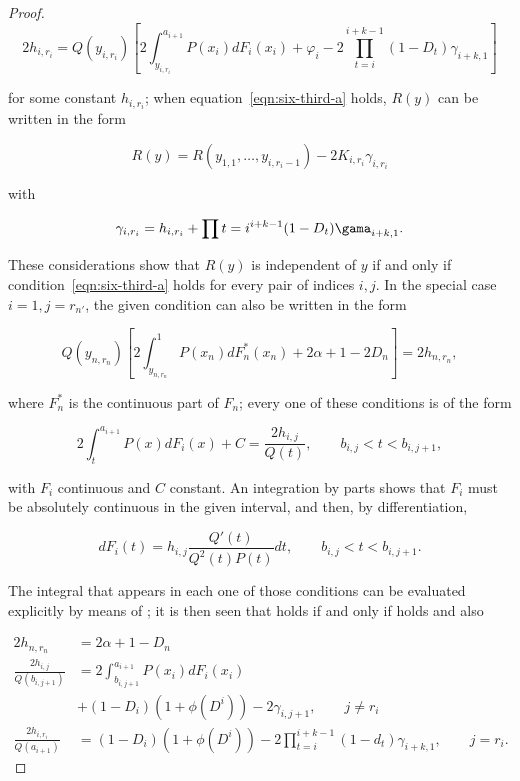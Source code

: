 \documentclass{article}
\begin{document}
\begin{proof}
\begin{equation}
 2h_{i,r_i} = Q(y_{i,r_i}) \left [ 2 \int_{y_{i,r_i}}^{a_{i+1}} P(x_i) dF_i(x_i)
+ \varphi_i - 2 \prod_{t=i}^{i+k-1} (1-D_t) \gamma_{i+k, 1} \right ] \label{eqn:six-third-a}
\end{equation}

for some constant $h_{i,r_i}$; when equation~\ref{eqn:six-third-a} holds, $R(y)$
can be written in the form

\begin{equation}
R(y) = R(y_{1,1}, \dots, y_{i, r_i - 1}) - 2K_{i, r_i} \gamma_{i, r_i}
\label{eqn:six-third-b}
\end{equation}

with

\begin{equation}
\gamma_{i, r_i} = h_{i, r_i} + \prod{t=i}^{i+k-1} (1-D_t) \gama_{i+k, 1}.
\label{eqn:six-three}
\end{equation}

These considerations show that $R(y)$ is independent of $y$ if and only if
condition~\ref{eqn:six-third-a} holds for every pair of indices $i, j$.  In the
special case $i=1, j=r_{n'}$, the given condition can also be written in the
form

\[
Q(y_{n,r_n}) \left [ 2 \int_{y_{n,r_n}}^{1} P(x_n) dF_n^*(x_n)
+ 2 \alpha + 1 - 2 D_n \right ] = 2h_{n,r_n},
\]

where $F_n^*$ is the continuous part of $F_n$; every one of these conditions is
of the form

\[
2 \int_{t}^{a_{i+1}} P(x) dF_i(x) + C = \frac{2h_{i, j}}{Q(t)},
\qquad b_{i,j} < t < b_{i, j+1},
\]

with $F_i$ continuous and $C$ constant. An integration by parts shows that
$F_i$ must be absolutely continuous in the given interval, and then, by
differentiation,

\begin{equation}
dF_i(t) = h_{i,j} \frac{Q'(t)}{Q^2(t) P(t)} dt, \qquad b_{i,j} < t < b_{i, j+1}.
\label{eqn:six-third-c}
\end{equation}

The integral that appears in each one of those conditions
\label{eqn:six-third-a} can be evaluated explicitly by means of
\label{eqn:six-third-c}; it is then seen that \label{eqn:six-third-a} holds if
and only if \label{eqn:six-third-c} holds and also

\begin{equation}
\begin{split}
2h_{n, r_n} &= 2\alpha + 1 - D_n \\
\frac{2h_{i,j}}{Q(b_{i, j+1})} &= 2 \int_{b_{i, j+1}}^{a_{i+1}} P(x_i) dF_i(x_i) \\
&+ (1-D_i)(1 + \phi(D^i)) - 2 \gamma_{i, j+1}, \qquad j \neq r_i  \\
\frac{2h_{i,r_i}}{Q(a_{i+1})} &=
(1-D_i)(1 + \phi(D^i)) - 2 \prod_{t=i}^{i+k-1} (1-d_t) \gamma_{i+k, 1}, \qquad j
= r_i.
\end{split}
\label{eqn:six-d}
\end{equation}


\end{proof}
\end{document}
